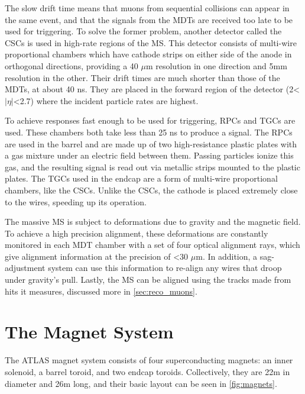 The slow drift time means that muons from sequential collisions can appear in the same event, and that the signals from the \acp{MDT} are received too late to be used for triggering. To solve the former problem, another detector called the \acp{CSC} is used in high-rate regions of the \ac{MS}. This detector consists of multi-wire proportional chambers which have cathode strips on either side of the anode in orthogonal directions, providing a 40 $\mu$m resolution in one direction and 5mm resolution in the other. Their drift times are much shorter than those of the \acp{MDT}, at about 40 ns. They are placed in the forward region of the detector (2<$|\eta|$<2.7) where the incident particle rates are highest. 

To achieve responses fast enough to be used for triggering, \acp{RPC} and \acp{TGC} are used. These chambers both take less than 25 ns to produce a signal. The \acp{RPC} are used in the barrel and are made up of two high-resistance plastic plates with a gas mixture under an electric field between them. Passing particles ionize this gas, and the resulting signal is read out via metallic strips mounted to the plastic plates. The \acp{TGC} used in the endcap are a form of multi-wire proportional chambers, like the \acp{CSC}. Unlike the \acp{CSC}, the cathode is placed extremely close to the wires, speeding up its operation. 

The massive \ac{MS} is subject to deformations due to gravity and the magnetic field. To achieve a high precision alignment, these deformations are constantly monitored in each \ac{MDT} chamber with a set of four optical alignment rays, which give alignment information at the precision of <30 $\mu$m. In addition, a sag-adjustment system can use this information to re-align any wires that droop under gravity's pull. Lastly, the \ac{MS} can be aligned using the tracks made from hits it measures, discussed more in \autoref{sec:reco_muons}.

\section{The Magnet System}
\label{sec:magnets}

The \ac{ATLAS} magnet system consists of four superconducting magnets: an inner solenoid, a barrel toroid, and two endcap toroids. Collectively, they are 22m in diameter and 26m long, and their basic layout can be seen in \autoref{fig:magnets}.

